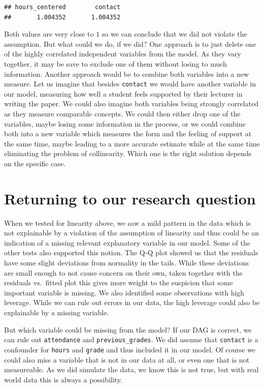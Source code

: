 \documentclass[
]{book}
\begin{document}
\begin{verbatim}
## hours_centered        contact 
##       1.004352       1.004352
\end{verbatim}

Both values are very close to \(1\) so we can conclude that we did not violate the assumption. But what could we do, if we did? One approach is to just delete one of the highly correlated independent variables from the model. As they vary together, it may be save to exclude one of them without losing to much information. Another approach would be to combine both variables into a new measure. Let us imagine that besides \texttt{contact} we would have another variable in our model, measuring how well a student feels supported by their lecturer in writing the paper. We could also imagine both variables being strongly correlated as they measure comparable concepts. We could then either drop one of the variables, maybe losing some information in the process, or we could combine both into a new variable which measures the form and the feeling of support at the same time, maybe leading to a more accurate estimate while at the same time eliminating the problem of collinearity. Which one is the right solution depends on the specific case.

\hypertarget{returning-to-our-research-question-1}{%
\section{Returning to our research question}\label{returning-to-our-research-question-1}}

When we tested for linearity above, we saw a mild pattern in the data which is not explainable by a violation of the assumption of linearity and thus could be an indication of a missing relevant explanatory variable in our model. Some of the other tests also supported this notion. The Q-Q plot showed us that the residuals have some slight deviations from normality in the tails. While these deviations are small enough to not cause concern on their own, taken together with the residuals vs.~fitted plot this gives more weight to the suspicion that some important variable is missing. We also identified some observations with high leverage. While we can rule out errors in our data, the high leverage could also be explainable by a missing variable.

But which variable could be missing from the model? If our DAG is correct, we can rule out \texttt{attendance} and \texttt{previous\_grades}. We did assume that \texttt{contact} is a confounder for \texttt{hours} and \texttt{grade} and thus included it in our model. Of course we could also miss a variable that is not in our data at all, or even one that is not measureable. As we did simulate the data, we know this is not true, but with real world data this is always a possibility.
\end{document}

